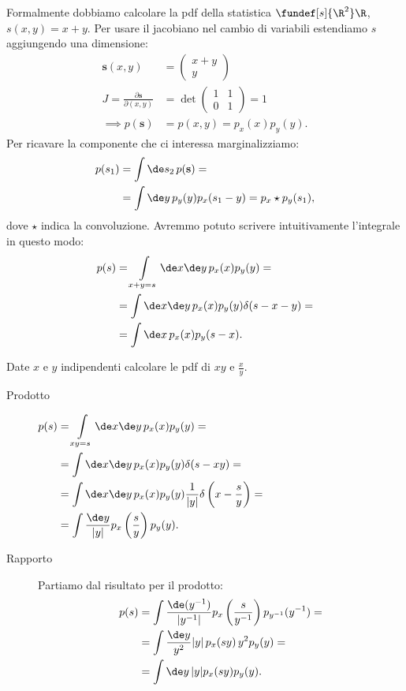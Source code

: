\begin{solution*}
	Formalmente dobbiamo calcolare la pdf della statistica $\fundef[s]{\R^2}\R$,
	$s(x,y)=x+y$.
	Per usare il jacobiano nel cambio di variabili estendiamo $s$ aggiungendo una dimensione:
	\begin{align*}
		\mathbf s(x,y) &= \left(\begin{matrix}
			x+y \\
			y
		\end{matrix} \right) \\
		J = \frac{\partial\mathbf s}{\partial(x,y)} &= \det\left(\begin{matrix}
			1 & 1 \\
			0 & 1
		\end{matrix}\right) = 1 \\
		\implies p(\mathbf s) &= p(x,y) = p_x(x)p_y(y).
	\end{align*}
	Per ricavare la componente che ci interessa marginalizziamo:
	\begin{align*}
		p(s_1) &= \int \de s_2\, p(\mathbf s) = \\
		&= \int \de y\, p_y(y) p_x(s_1 - y) = p_x \star p_y (s_1),
	\end{align*}
	dove $\star$ indica la convoluzione.
	Avremmo potuto scrivere intuitivamente l'integrale in questo modo:
	\begin{align*}
		p(s) &= \int\limits_{x+y = s} \de x\de y\, p_x(x) p_y(y) = \\
		&= \int \de x\de y\, p_x(x) p_y(y) \delta(s - x - y) = \\
		&= \int \de x\, p_x(x) p_y(s-x).
	\end{align*}
\end{solution*}

\begin{exercise}
	Date $x$ e $y$ indipendenti calcolare le pdf di $xy$ e $\frac xy$.
\end{exercise}

\begin{solution}
	\begin{description}
		\item[Prodotto]
			$\begin{aligned}[t]
				p(s) &= \int\limits_{xy=s} \de x\de y\, p_x(x) p_y(y) = \\
				&= \int\de x\de y\, p_x(x)p_y(y)\delta(s-xy) = \\
				&= \int\de x\de y\, p_x(x)p_y(y)\frac1{|y|}\delta\left(x-\frac sy\right) = \\
				&= \int\frac{\de y}{|y|}p_x\left(\frac sy\right)p_y(y).
			\end{aligned}$
		\item[Rapporto]
			Partiamo dal risultato per il prodotto:
			\begin{align*}
				p(s) &= \int\frac{\de(y^{-1})}{|y^{-1}|}p_x\left(\frac s{y^{-1}}\right)p_{y^{-1}}(y^{-1}) = \\
				&= \int\frac{\de y}{y^2}|y|\,p_x(sy)\,y^2 p_y(y) = \\
				&= \int\de y\, |y|p_x(sy)p_y(y).
			\end{align*}
	\end{description}
\end{solution}

